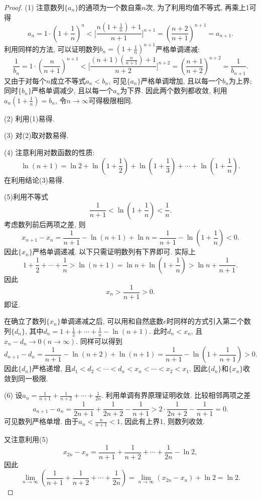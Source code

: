 \documentclass[UTF8,11pt, a4paper, oneside, fontset=none]{ctexbook}
\begin{document}
\begin{enumerate}
\begin{proof}
(1) 注意数列$\{ a_n \}$的通项为一个数自乘$n$次, 为了利用均值不等式, 再乘上1可得
\[
a_n = 1 \cdot  \left( 1 + \frac{1}{n} \right)^n < \Big[ \frac{n \left( 1 + \frac{1}{n} \right) + 1 }{n+1} \Big]^{n+1} =  \left( \frac{ n+ 2}{n+1} \right)^{n+1} = a_{n+1}.
\]
利用同样的方法, 可以证明数列$b_n =  \left( 1 + \frac{1}{n} \right)^{n+1}$严格单调递减:
\[
\frac{1}{b_n} = 1 \cdot  \left( \frac{n}{n+1} \right)^{n+1} < \Big[ \frac{(n+1)\left( \frac{n}{n+1}\right)+1}{n+2}\Big]^{n+2} =  \left( \frac{n+1}{n+2} \right)^{n+2}  = \frac{1}{b_{n+1}}.
\] 
又由于对每个$n$成立不等式$a_n < b_n$, 可见$\{a_n \}$严格单调增加, 且以每一个$b_n$为上界; 同时$\{b_n \}$严格单调减少, 且以每一个$a_n$为下界. 因此两个数列都收敛, 利用$a_n (1 + \frac{1}{n}) =b_n$, 令$n \to \infty$可得极限相同.

(2) 利用(1)易得.

(3) 对(2)取对数易得.

(4) 注意利用对数函数的性质:
\[
\ln(n+1) = \ln 2 + \ln (1 + \frac{1}{2}) + \ln (1 + \frac{1}{3}) + \cdots + \ln (1 + \frac{1}{n}).
\]
在利用结论(3)易得.

(5)利用不等式
\[
\frac{1}{n+1} < \ln(1 + \frac{1}{n}) < \frac{1}{n}.
\]
考虑数列前后两项之差, 则
\[
x_{n+1} - x_n  = \frac{1}{n+1} - \ln(n+1) + \ln n = \frac{1}{n+1} - \ln \left( 1 + \frac{1}{n} \right) < 0.
\]
因此$\{x_n\}$严格单调递减. 以下只需证明数列有下界即可. 实际上
\[
1 + \frac{1}{2} + \cdots + \frac{1}{n} > \ln(n+1) = \ln n + \ln  \left( 1 + \frac{1}{n} \right) > \ln n + \frac{1}{n+1}.
\]
因此
\[
x_n > \frac{1}{n+1} >0.
\]
即证.


在确立了数列$\{ x_n \}$单调递减之后, 可以用和自然底数$e$时同样的方式引入第二个数列$\{d_n\}$, 其中$d_n = 1 + \frac{1}{2} + \cdots + \frac{1}{n} - \ln(n+1)$. 此时$d_n < x_n$, 且$x_n - d_n \to 0 (n \to \infty)$. 同样可以得到
\[
d_{n+1} - d_n = \frac{1}{n+1} - \ln(n+2) + \ln(n+1) = \frac{1}{n+1} - \ln \left( 1 + \frac{1}{n+1} \right) >0.
\]
因此$\{d_n\}$严格递增, 且$d_1 < d_2 < \cdots < d_n < x_n < \cdots < x_2 < x_1$. 因此$\{d_n\}$和$\{x_n\}$收敛到同一极限.

(6) 设$a_n = \frac{1}{n+1} + \frac{1}{n+2} + \cdots + \frac{1}{2n}$. 利用单调有界原理证明收敛. 比较相邻两项之差
\[
a_{n+1} - a_n =\frac{1}{2n+1} + \frac{1}{2n+2} - \frac{1}{n+1} >  2 \cdot \frac{1}{2n+2} - \frac{1}{n+1} =0.
\]
可见数列严格单增. 由于$a_n < \frac{n}{n+1} <1$, 因此有上界1, 则数列收敛.


又注意利用(5)
\[
x_{2n} - x_n =  \frac{1}{n+1} + \frac{1}{n+2} + \cdots + \frac{1}{2n} - \ln 2,
\]
因此
\[
\lim_{n \to \infty} \left(  \frac{1}{n+1} + \frac{1}{n+2} + \cdots + \frac{1}{2n} \right) = \lim_{n \to \infty}(x_{2n} - x_n) + \ln 2 = \ln 2.
\]



\end{proof}
\end{enumerate}
\end{document}
